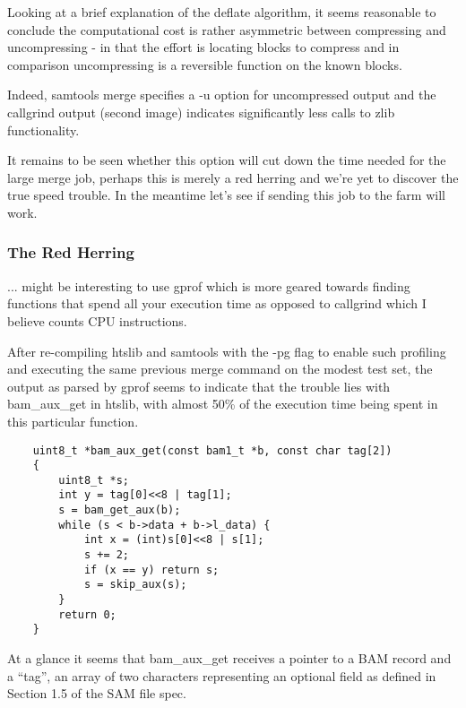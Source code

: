 Looking at a brief explanation of the deflate algorithm, it seems reasonable to
conclude the computational cost is rather asymmetric between compressing and
uncompressing - in that the effort is locating blocks to compress and in
comparison uncompressing is a reversible function on the known blocks.

Indeed, samtools merge specifies a -u option for uncompressed output and the
callgrind output (second image) indicates significantly less calls to zlib
functionality.

It remains to be seen whether this option will cut down the time needed for the
large merge job, perhaps this is merely a red herring and we’re yet to discover
the true speed trouble. In the meantime let’s see if sending this job to the
farm will work.


\subsubsection{The Red Herring}

... might be interesting to use gprof which is more
geared towards finding functions that spend all your execution time as opposed
to callgrind which I believe counts CPU instructions.

After re-compiling htslib and samtools with the -pg flag to enable such
profiling and executing the same previous merge command on the modest test set,
the output as parsed by gprof seems to indicate that the trouble lies with
bam\_aux\_get in htslib, with almost 50\% of the execution time being spent in
this particular function.

\begin{verbatim}
    uint8_t *bam_aux_get(const bam1_t *b, const char tag[2])
    {
        uint8_t *s;
        int y = tag[0]<<8 | tag[1];
        s = bam_get_aux(b);
        while (s < b->data + b->l_data) {
            int x = (int)s[0]<<8 | s[1];
            s += 2;
            if (x == y) return s;
            s = skip_aux(s);
        }
        return 0;
    }
\end{verbatim}


At a glance it seems that bam\_aux\_get receives a pointer to a BAM record and a
“tag”, an array of two characters representing an optional field as defined in
Section 1.5 of the SAM file spec.

